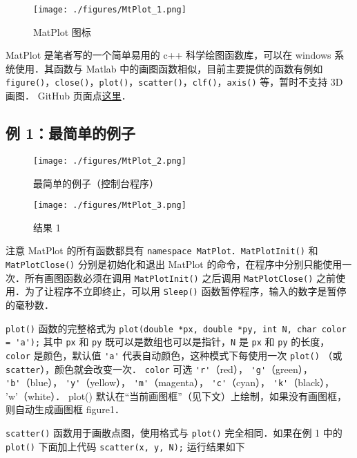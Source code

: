 
\begin{figure}[ht]
\centering
\texttt{[image: ./figures/MtPlot\_1.png]}
\caption{MatPlot 图标} \label{MtPlot_fig1}
\end{figure}

MatPlot 是笔者写的一个简单易用的 c++ 科学绘图函数库，可以在 windows 系统使用．其函数与 Matlab 中的画图函数相似，目前主要提供的函数有例如 \verb|figure()|，\verb|close()|，\verb|plot()|，\verb|scatter()|，\verb|clf()|，\verb|axis()| 等，暂时不支持 3D 画图． GitHub 页面点\href{https://github.com/MacroUniverse/MatPlot}{这里}．


\subsection{例 1：最简单的例子}

\begin{figure}[ht]
\centering
\texttt{[image: ./figures/MtPlot\_2.png]}
\caption{最简单的例子（控制台程序）} \label{MtPlot_fig2}
\end{figure}

\begin{figure}[ht]
\centering
\texttt{[image: ./figures/MtPlot\_3.png]}
\caption{结果 1} \label{MtPlot_fig3}
\end{figure}

注意 MatPlot 的所有函数都具有 \verb|namespace MatPlot|．\verb|MatPlotInit()| 和 \verb|MatPlotClose()| 分别是初始化和退出 MatPlot 的命令，在程序中分别只能使用一次．所有画图函数必须在调用 \verb|MatPlotInit()| 之后调用 \verb|MatPlotClose()| 之前使用．为了让程序不立即终止，可以用 \verb|Sleep()| 函数暂停程序，输入的数字是暂停的毫秒数．

\verb|plot()| 函数的完整格式为
\verb|plot(double *px, double *py, int N, char color = 'a');|
其中 \verb|px| 和 \verb|py| 既可以是数组也可以是指针，\verb|N| 是 \verb|px| 和 \verb|py| 的长度，\verb|color| 是颜色，默认值 \verb|'a'| 代表自动颜色，这种模式下每使用一次 \verb|plot()| （或 \verb|scatter|），颜色就会改变一次． \verb|color| 可选 \verb|'r'|（red）， \verb|'g'|（green）， \verb|'b'|（blue）， \verb|'y'|（yellow）， \verb|'m'|（magenta）， \verb|'c'|（cyan）， \verb|'k'|（black）， 'w'（white）． plot() 默认在“当前画图框”（见下文）上绘制，如果没有画图框，则自动生成画图框 figure1．

\verb|scatter()| 函数用于画散点图，使用格式与 \verb|plot()| 完全相同．如果在例 1 中的 \verb|plot()| 下面加上代码
\verb|scatter(x, y, N);|
运行结果如下

